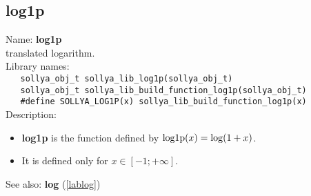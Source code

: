 \subsection{log1p}
\label{lablog1p}
\noindent Name: \textbf{log1p}\\
\phantom{aaa}translated logarithm.\\[0.2cm]
\noindent Library names:\\
\verb|   sollya_obj_t sollya_lib_log1p(sollya_obj_t)|\\
\verb|   sollya_obj_t sollya_lib_build_function_log1p(sollya_obj_t)|\\
\verb|   #define SOLLYA_LOG1P(x) sollya_lib_build_function_log1p(x)|\\[0.2cm]
\noindent Description: \begin{itemize}

\item \textbf{log1p} is the function defined by ${\rm log1p}(x) = \log(1+x)$.

\item It is defined only for $x \in [-1; +\infty]$.
\end{itemize}
See also: \textbf{log} (\ref{lablog})
